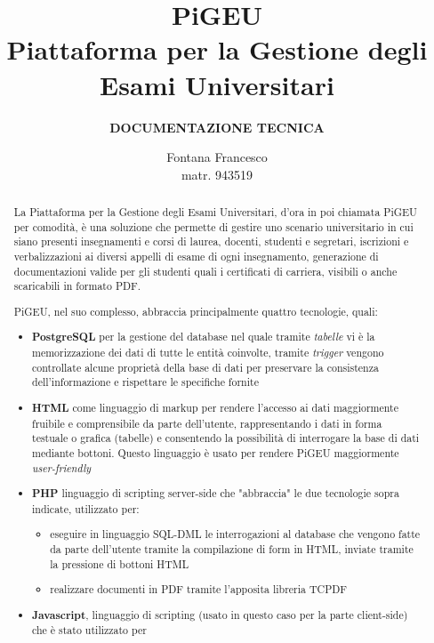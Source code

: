 \documentclass{article}
\title{PiGEU\\ Piattaforma per la Gestione degli Esami Universitari}
\author{\textbf{DOCUMENTAZIONE TECNICA}}
\date{Fontana Francesco \\ matr. 943519}
\begin{document}
    \maketitle

    \begin{abstract}

        La Piattaforma per la Gestione degli Esami Universitari, d'ora in poi chiamata PiGEU per comodità, è una soluzione che permette di gestire
        uno scenario universitario in cui siano presenti insegnamenti e corsi di laurea, docenti, studenti e segretari, iscrizioni e verbalizzazioni
        ai diversi appelli di esame di ogni insegnamento, generazione di documentazioni valide per gli studenti quali i certificati di carriera, visibili
        o anche scaricabili in formato PDF.

        PiGEU, nel suo complesso, abbraccia principalmente quattro tecnologie, quali:
        \begin{itemize}
            \item \textbf{PostgreSQL} per la gestione del database nel quale tramite \emph{tabelle} vi è la memorizzazione dei dati di tutte
            le entità coinvolte, tramite \emph{trigger} vengono controllate alcune proprietà della base di dati per preservare la consistenza dell'informazione e rispettare le specifiche fornite
            \item \textbf{HTML} come linguaggio di markup per rendere l'accesso ai dati maggiormente fruibile e comprensibile da parte dell'utente, rappresentando i dati in forma testuale o grafica (tabelle) e consentendo la possibilità di interrogare la base di dati mediante bottoni. Questo linguaggio è usato per rendere PiGEU maggiormente \emph{user-friendly}
            \item \textbf{PHP} linguaggio di scripting server-side che "abbraccia" le due tecnologie sopra indicate, utilizzato per:
            \begin{itemize}
                \item eseguire in linguaggio SQL-DML le interrogazioni al database che vengono fatte da parte dell'utente tramite la compilazione di form in HTML, inviate tramite la pressione di bottoni HTML
                \item realizzare documenti in PDF tramite l'apposita libreria TCPDF
            \end{itemize}
            \item \textbf{Javascript}, linguaggio di scripting (usato in questo caso per la parte client-side) che è stato utilizzato per

\end{itemize}
\end{abstract}
\end{document}
